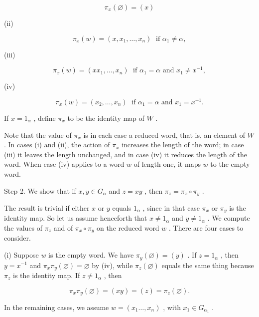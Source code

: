\documentclass[10pt]{article}
\begin{document}
\[
{\pi }_{x}\left( \varnothing \right)  = \left( x\right)
\]

(ii)

\[
{\pi }_{x}\left( w\right)  = \left( {x,{x}_{1},\ldots ,{x}_{n}}\right) \;\text{ if }{\alpha }_{1} \neq  \alpha ,
\]

(iii)

\[
{\pi }_{x}\left( w\right)  = \left( {x{x}_{1},\ldots ,{x}_{n}}\right) \;\text{ if }{\alpha }_{1} = \alpha \text{ and }{x}_{1} \neq  {x}^{-1},
\]

(iv)

\[
{\pi }_{x}\left( w\right)  = \left( {{x}_{2},\ldots ,{x}_{n}}\right) \;\text{ if }{\alpha }_{1} = \alpha \text{ and }{x}_{1} = {x}^{-1}.
\]

If \(x = {1}_{\alpha }\) , define \({\pi }_{x}\) to be the identity map of \(W\) .

Note that the value of \({\pi }_{x}\) is in each case a reduced word, that is, an element of \(W\) . In cases (i) and (ii), the action of \({\pi }_{x}\) increases the length of the word; in case (iii) it leaves the length unchanged, and in case (iv) it reduces the length of the word. When case (iv) applies to a word \(w\) of length one, it maps \(w\) to the empty word.

Step 2. We show that if \(x,y \in  {G}_{\alpha }\) and \(z = {xy}\) , then \({\pi }_{z} = {\pi }_{x} \circ  {\pi }_{y}\) .

The result is trivial if either \(x\) or \(y\) equals \({1}_{\alpha }\) , since in that case \({\pi }_{x}\) or \({\pi }_{y}\) is the identity map. So let us assume henceforth that \(x \neq  {1}_{\alpha }\) and \(y \neq  {1}_{\alpha }\) . We compute the values of \({\pi }_{z}\) and of \({\pi }_{x} \circ  {\pi }_{y}\) on the reduced word \(w\) . There are four cases to consider.

(i) Suppose \(w\) is the empty word. We have \({\pi }_{y}\left( \varnothing \right)  = \left( y\right)\) . If \(z = {1}_{\alpha }\) , then \(y = {x}^{-1}\) and \({\pi }_{x}{\pi }_{y}\left( \varnothing \right)  = \varnothing\) by (iv), while \({\pi }_{z}\left( \varnothing \right)\) equals the same thing because \({\pi }_{z}\) is the identity map. If \(z \neq  {1}_{\alpha }\) , then

\[
{\pi }_{x}{\pi }_{y}\left( \varnothing \right)  = \left( {xy}\right)  = \left( z\right)  = {\pi }_{z}\left( \varnothing \right) .
\]

In the remaining cases, we assume \(w = \left( {{x}_{1}\ldots ,{x}_{n}}\right)\) , with \({x}_{1} \in  {G}_{{\alpha }_{1}}\) .
\end{document}
